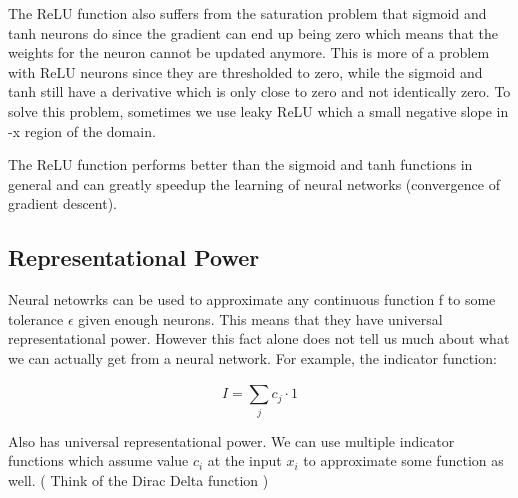 \documentclass[11pt]{article}
\begin{document}
The ReLU function also suffers from the saturation problem that sigmoid and tanh neurons do since the
gradient can end up being zero which means that the weights for the neuron cannot be updated
anymore. This is more of a problem with ReLU neurons since they are thresholded to zero, while the 
sigmoid and tanh still have a derivative which is only close to zero and not identically zero. 
To solve this problem, sometimes we use leaky ReLU which a small negative slope in -x region 
of the domain. 

The ReLU function performs better than the sigmoid and tanh functions in general and can 
greatly speedup the learning of neural networks (convergence of gradient descent).


\subsection{Representational Power}
\label{sec:org31f2d3a}

Neural netowrks can be used to approximate any continuous function f to some tolerance \(\epsilon\) given enough neurons.
This means that they have universal representational power. However this fact alone does not tell 
us much about what we can actually get from a neural network. For example, the indicator function: 

\begin{center}
\begin{equation}
I = \sum_{j}^{} c_j \cdot 1
\end{equation}
\end{center} 

Also has universal representational power. We can use multiple indicator functions which assume value \(c_i\) at 
the input \(x_i\) to approximate some function as well. ( Think of the Dirac Delta function )
\end{document}
